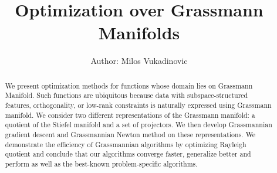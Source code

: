 \documentclass[11pt,a4paper]{report}
\title{Optimization over Grassmann Manifolds}
\author{Author: Milos Vukadinovic}
\date{\parbox{\linewidth}{\centering%
  \endgraf\bigskip
  Advisor: Peter Dalakov \endgraf\medskip
  \bigskip
  Department\ of Mathematics,  \endgraf
  American University in Bulgaria \endgraf
  \bigskip
  \today}}
\begin{document}
\maketitle

\begin{abstract}
We present optimization methods for functions whose domain lies on Grassmann Manifold.
Such functions are ubiquitous because data with subspace-structured features, orthogonality, or low-rank constraints is naturally expressed using Grassmann manifold.
We consider two different representations of the Grassmann manifold: a quotient of the Stiefel manifold and a set of projectors.
We then develop Grassmannian gradient descent and Grassmannian Newton method on these representations.
We demonstrate the efficiency of Grassmannian algorithms by optimizing Rayleigh quotient and conclude that our algorithms converge faster,
generalize better and perform as well as the best-known problem-specific algorithms. 
\end{abstract}

\setcounter{tocdepth}{1}
\tableofcontents
\end{document}

